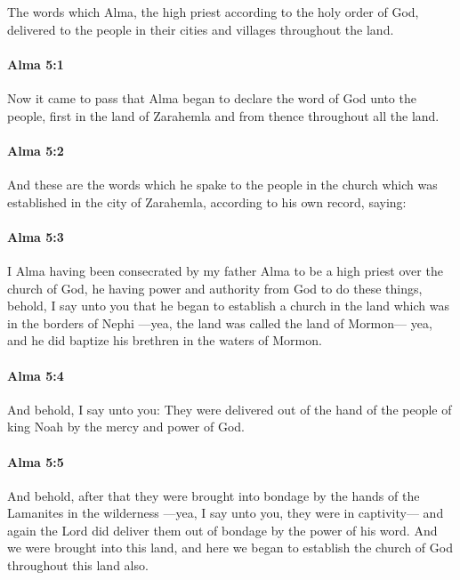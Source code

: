 		The words which Alma,
		the high priest according to the holy order of God,
		delivered to the people in their cities and villages throughout the land.
		
		\paragraph{Alma 5:1} %
			\label{ALMA-5-1}

			Now it came to pass that
			Alma began to declare the word of God unto the people,
			first in the land of Zarahemla and from thence throughout all the land.

		\paragraph{Alma 5:2} %
			\label{ALMA-5-2}

			And these are the words which he spake to the people in the church
			which was established in the city of Zarahemla,
			according to his own record, saying:

		\paragraph{Alma 5:3} %
			\label{ALMA-5-3}

			I Alma having been consecrated by my father Alma
			to be a high priest over the church of God,
			he having power and authority from God to do these things,
			behold, I say unto you
			that he began to establish a church in the land
			which was in the borders of Nephi
			---yea, the land was called the land of Mormon---
			yea, and he did baptize his brethren in the waters of Mormon.

		\paragraph{Alma 5:4} %
			\label{ALMA-5-4}

			And behold, I say unto you:
			They were delivered out of the hand of the people of king Noah
			by the mercy and power of God.

		\paragraph{Alma 5:5} %
			\label{ALMA-5-5}

			And behold, after that they were brought into bondage
			by the hands of the Lamanites in the wilderness
			---yea, I say unto you, they were in captivity---
			and again the Lord did deliver them out of bondage by the power of his word.
			And we were brought into this land,
			and here we began to establish the church of God throughout this land also.

